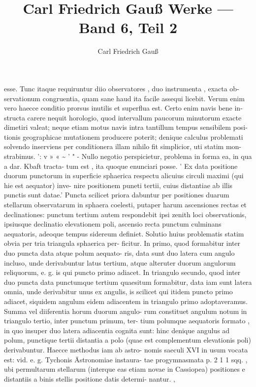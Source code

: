 \documentclass[12pt,a4paper]{article}
\title{Carl Friedrich Gau\ss{} Werke --- Band 6, Teil 2}
\author{Carl Friedrich Gau\ss{}}
\date{}
\begin{document}
\maketitle
\thispagestyle{empty}


\newpage

esse.  Tunc  itaque  requiruntur  diio  observatores ,  duo  instrumenta ,  exacta  ob-
servationum  congruentia,  quam  sane  haud  ita  facile  assequi  licebit.  Verum  enim
vero  haecce  conditio  prorsus  inutilis  et  superflua  est.  Certo  enim  navis  bene  in-
structa  carere  nequit  horologio,  quod  intervallum  paucorum  minutorum  exacte
dimetiri  valeat;  neque  etiam  motus  navis  intra  tantillum  tempus  sensibilem  posi-
tionis  geographicae  mutationem  producere  poterit;  denique  calculus  problemati
solvendo  inserviens  per  conditionera  illam  nihilo  fit  simplicior,  uti  statim  mon-
strabimus.  ':           v   » « \textasciitilde{}  '     "       -
Nullo  negotio  perspicietur,  problema  in  forma  ea,  in  qua  a  dar.  Kbaft  tracta-
tum  est ,  ita  quoque  enunciari  posse.  '  Ex  data  positione  duorum  punctorum  in
superficie  sphaerica  respectu  alicuius  circuli  maximi  (qui  hie  est  aequator)  inve-
nire  positionem  puneti  tertii,  cuius  distantiae  ab  illis  punctis  sunt  datae.'  Puncta
scilicet  priora  dabuntur  per  positiones  duarum  stellarum  observatarum  in  sphaera
coelesti,  putaper  harum  ascensiones  rectas  et  declinationes:  punctum  tertium
autem  respondebit  ipsi  zenith  loci  observationis,  ipsiusque  declinatio  elevationem
poli,  ascensio  recta  punctum  culminans  aequatoris,  adeoque  tempus  sidereum
definiet.  Solutio  huius  problematis  statim  obvia  per  tria  triangula  sphaerica  per-
ficitur.  In  primo,  quod  formabitur  inter  duo  puncta  data  atque  polum  aequato-
ris, data  sunt  duo  latera  cum  angulo  incluso,  unde  derivabuntur  latus  tertium,
atque  alteruter  duorum  angulorum  reliquorum,  e.  g.  is  qui  puncto  primo  adiacet.
In  triangulo  secundo,  quod  inter  duo  puncta  data  punctumque  tertium  quaesitum
formabitur,  data  iam  sunt  latera  omnia,  unde  derivabitur  unus  ex  angulis,  is
scilicet  qui  itidem  puncto  primo  adiacet,  siquidem  angulum  eidem  adiacentem  in
triangulo  primo  adoptaveramus.  Summa  vel  diiferentia  horum  duorum  angulo-
rum constituet  angulum  notum  in  triangulo  tertio,  inter  punctum  primum,  ter-
tium polumque  aequatoris  formato ,  in  quo  insuper  duo  latera  adiacentia  cognita
sunt:  hinc  denique  angulus  ad  polum,  punctique  tertii  distantia  a  polo  (quae  est
complementum  elevationis  poli)  derivabuntur.  Haecce  methodus  iam  ab  astro-
nomis  saeculi  XVI  in  usum  vocata  est:  vid.  e.  g.  Tychonis  Ästronomiae  instaura-
tae  progymnasmata  p.  2 1 1  sqq. ,  ubi  permultarum  stellarum  (interque  eas  etiam
novae  in  Cassiopea)  positiones  e  distantiis  a  binis  stellis  positione  datis  determi-
nantur.  ,
\end{document}
